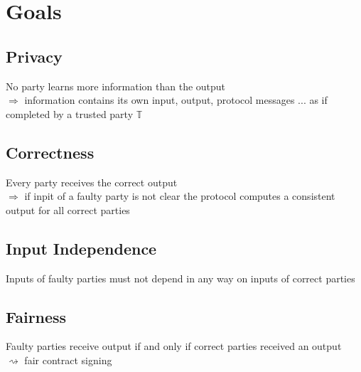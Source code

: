 \documentclass{report}
\begin{document}
 \section{Goals}
 \begin{adjustwidth}{2em}{2em}
 	\subsection{Privacy}
 	\begin{adjustwidth}{2em}{}
 		No party learns more information than the output \\
 		$\Rightarrow$ information contains its own input, output, protocol messages
 		... as if completed by a trusted party $\mathbb{T}$
 	\end{adjustwidth}
 	\subsection{Correctness}
 	\begin{adjustwidth}{2em}{}
 		Every party receives the correct output \\
 		$\Rightarrow$ if inpit of a faulty party is not clear the protocol computes a consistent output for all correct parties
 	\end{adjustwidth}
 	\subsection{Input Independence}
 	\begin{adjustwidth}{2em}{}
 		Inputs of faulty parties must not depend in any way on inputs of correct parties
 	\end{adjustwidth}
 	\subsection{Fairness}
 	\begin{adjustwidth}{2em}{}
 		Faulty parties receive output if and only if correct parties received an output \\
 		$\rightsquigarrow$ fair contract signing
 	\end{adjustwidth}
 \end{adjustwidth}
 
\end{document}
